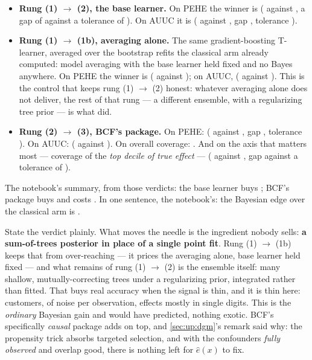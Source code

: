 \begin{itemize}[leftmargin=*]
  \item \textbf{Rung (1) $\to$ (2), the base learner.} On PEHE the winner is
        \textbf{\nbOneRungBlPeheWin} (\nbOneRungBlPeheA{} against \nbOneRungBlPeheB, a gap of
        \nbOneRungBlPeheGap{} against a tolerance of \nbOneRungBlPeheTol). On AUUC it is
        \textbf{\nbOneRungBlAuucWin} (\nbOneRungBlAuucA{} against \nbOneRungBlAuucB, gap
        \nbOneRungBlAuucGap, tolerance \nbOneRungBlAuucTol).
  \item \textbf{Rung (1) $\to$ (1b), averaging alone.} The same gradient-boosting T-learner,
        averaged over the \nbOneNBootCate{} bootstrap refits the classical arm already computed:
        model averaging with the base learner held fixed and no Bayes anywhere. On PEHE the winner
        is \textbf{\nbOneRungBagPeheWin} (\nbOneRungBagPeheA{} against \nbOneRungBagPeheB); on AUUC,
        \textbf{\nbOneRungBagAuucWin} (\nbOneRungBagAuucA{} against \nbOneRungBagAuucB). This is the
        control that keeps rung (1) $\to$ (2) honest: whatever averaging alone does not deliver, the
        rest of that rung --- a different ensemble, with a regularizing tree prior --- is what did.
  \item \textbf{Rung (2) $\to$ (3), BCF's package.} On PEHE: \textbf{\nbOneRungBcfPeheWin}
        (\nbOneRungBcfPeheA{} against \nbOneRungBcfPeheB, gap \nbOneRungBcfPeheGap, tolerance
        \nbOneRungBcfPeheTol). On AUUC: \textbf{\nbOneRungBcfAuucWin} (\nbOneRungBcfAuucA{} against
        \nbOneRungBcfAuucB). On overall coverage: \textbf{\nbOneRungBcfCovWin}. And on the axis
        that matters most --- coverage of the \emph{top decile of true effect} ---
        \textbf{\nbOneRungBcfTopdecWin} (\nbOneRungBcfTopdecA{} against \nbOneRungBcfTopdecB, gap
        \nbOneRungBcfTopdecGap{} against a tolerance of \nbOneRungBcfTopdecTol).
\end{itemize}

The notebook's summary, from those verdicts: the base learner buys \textbf{\nbOneAttrBaselearner};
BCF's package buys \textbf{\nbOneAttrBcfBuys} and costs \textbf{\nbOneAttrBcfCosts}. In one sentence,
the notebook's: the Bayesian edge over the classical arm is \nbOneAttrVerdict.

State the verdict plainly. What moves the needle is the ingredient nobody sells: \textbf{a
sum-of-trees posterior in place of a single point fit}. Rung (1) $\to$ (1b) keeps that from
over-reaching --- it prices the averaging alone, base learner held fixed --- and what remains of rung
(1) $\to$ (2) is the ensemble itself: many shallow, mutually-correcting trees under a regularizing
prior, integrated rather than fitted. That buys real accuracy when the signal is thin, and it is thin
here: \nbOneNCustomers{} customers,  of noise per observation, effects mostly in single digits.
This is the \emph{ordinary} Bayesian gain \citet{chipman2010} and \citet{hill2011} would have
predicted, nothing exotic. BCF's specifically \emph{causal} package adds \textbf{\nbOneAttrBcfBuys} on
top, and \cref{sec:up:dgm}'s remark said why: the propensity trick absorbs targeted selection, and
with the confounders \emph{fully observed} and overlap good, there is nothing left for $\hat e(x)$ to
fix.

